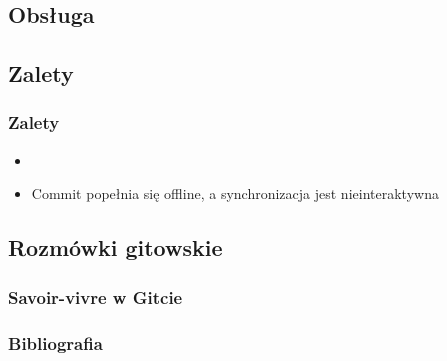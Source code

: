 \documentclass{beamer}
\begin{document}
\subsection{Obsługa}

\subsection{Zalety}
\begin{frame}
\frametitle{Zalety}
\begin{itemize}
 \item 
 \item Commit popełnia się offline, a synchronizacja jest nieinteraktywna
\end{itemize}
 
\end{frame}

\subsection{Rozmówki gitowskie}
\begin{frame}
 \frametitle{Savoir-vivre w Gitcie}
\end{frame}


\begin{frame}
\frametitle{Bibliografia}
\nocite{pro_git}

  
\end{frame}
\end{document}
